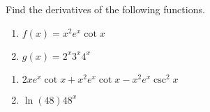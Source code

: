 {Find the derivatives of the following functions.
\begin{enumerate}
\item	$f(x) = x^2e^x\cot x$
\item	$g(x) = 2^x3^x4^x$
\end{enumerate}
}
{\begin{enumerate}
\item		$2xe^x\cot x + x^2e^x\cot x - x^2e^x\csc^2 x$
\item		$\ln(48)48^x$
\end{enumerate}
}
